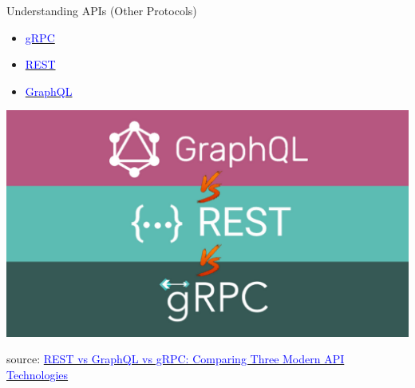 \documentclass{beamer}
\begin{document}
\begin{frame}[fragile,t]{Understanding APIs \small (Other Protocols)}
  
  \begin{minipage}[t]{0.2\textwidth}
    \begin{itemize}
      \item \href{https://grpc.io}{\textcolor{blue}{gRPC}}
      \item \href{https://en.wikipedia.org/wiki/REST}{\textcolor{blue}{REST}}
      \item \href{https://graphql.org}{\textcolor{blue}{GraphQL}} 
    \end{itemize}
  \end{minipage}
  \hfill
  \begin{minipage}[]{0.7\textwidth}
    \begin{center}
      \includegraphics[width=\textwidth, height=0.6\textheight]{img/api-protocols.png}
    \end{center}
  \end{minipage}
  
  \vspace{15mm}
      \tiny { source: \href{https://mobilelive.medium.com/rest-vs-graphql-vs-grpc-comparing-three-modern-api-technologies-9ba58abadd82}{\textcolor{blue}{REST vs GraphQL vs gRPC: Comparing Three Modern API Technologies}}}

\end{frame}
\end{document}
